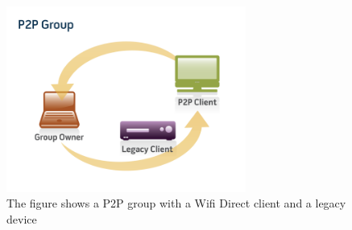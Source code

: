 \begin{figure}[ht]
	\centering
  \includegraphics[width=0.7\textwidth]{images/wifidirect.png}
	\caption{The figure shows a P2P group with a Wifi Direct client and a legacy device}
	\label{fig1}
\end{figure}